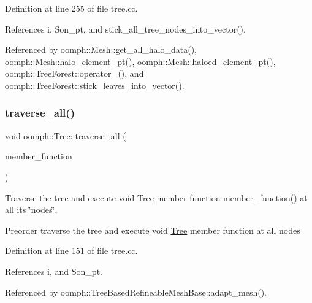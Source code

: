Definition at line 255 of file tree.\+cc.



References i, Son\+\_\+pt, and stick\+\_\+all\+\_\+tree\+\_\+nodes\+\_\+into\+\_\+vector().



Referenced by oomph\+::\+Mesh\+::get\+\_\+all\+\_\+halo\+\_\+data(), oomph\+::\+Mesh\+::halo\+\_\+element\+\_\+pt(), oomph\+::\+Mesh\+::haloed\+\_\+element\+\_\+pt(), oomph\+::\+Tree\+Forest\+::operator=(), and oomph\+::\+Tree\+Forest\+::stick\+\_\+leaves\+\_\+into\+\_\+vector().

\mbox{\label{classoomph_1_1Tree_a3caab39c8bee6fb65bbafed523aa6d3d}} 
\subsubsection{\texorpdfstring{traverse\+\_\+all()}{traverse\_all()}\hspace{0.1cm}{\footnotesize\ttfamily [1/2]}}
{\footnotesize\ttfamily void oomph\+::\+Tree\+::traverse\+\_\+all (\begin{DoxyParamCaption}\item[{\hyperlink{classoomph_1_1Tree_af04461175b6345658a215ecf039eb69e}{Tree\+::\+Void\+Member\+Fct\+Pt}}]{member\+\_\+function }\end{DoxyParamCaption})}



Traverse the tree and execute void \hyperlink{classoomph_1_1Tree}{Tree} member function member\+\_\+function() at all its \char`\"{}nodes\char`\"{}. 

Preorder traverse the tree and execute void \hyperlink{classoomph_1_1Tree}{Tree} member function at all nodes 

Definition at line 151 of file tree.\+cc.



References i, and Son\+\_\+pt.



Referenced by oomph\+::\+Tree\+Based\+Refineable\+Mesh\+Base\+::adapt\+\_\+mesh().

\mbox{\label{classoomph_1_1Tree_af5c67186ca9c87eef9ce7eaa0af41057}} 
